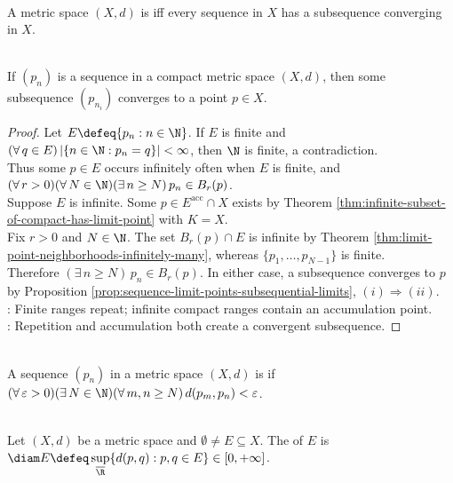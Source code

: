 \begin{definition} \label{def:sequentially-compact-metric-space} \\
A metric space $(X,d)$ is  iff every sequence in $X$ has a subsequence converging in $X$.
\end{definition}

\begin{theorem} \label{thm:compact-sequential-subsequence} \\
If $(p_n)$ is a sequence in a compact metric space $(X,d)$, then some subsequence $(p_{n_i})$ converges to a point $p\in X$.
\begin{proof}
Let $E\defeq\{p_n:n\in\N\}$. If $E$ is finite and $(\forall\,q\in E)\,|\{n\in\N:p_n=q\}|<\infty$, then $\N$ is finite, a contradiction.\\
Thus some $p\in E$ occurs infinitely often when $E$ is finite, and $(\forall\,r>0)(\forall\,N\in\N)(\exists\,n\geq N)\,p_n\in B_r(p)$.\\
Suppose $E$ is infinite. Some $p\in E^{\operatorname{acc}}\cap X$ exists by Theorem \ref{thm:infinite-subset-of-compact-has-limit-point} with $K=X$.\\
Fix $r>0$ and $N\in\N$. The set $B_r(p)\cap E$ is infinite by Theorem \ref{thm:limit-point-neighborhoods-infinitely-many}, whereas $\{p_1,\ldots,p_{N-1}\}$ is finite.\\
Therefore $(\exists\,n\geq N)\,p_n\in B_r(p)$. In either case, a subsequence converges to $p$ by Proposition \ref{prop:sequence-limit-points-subsequential-limits}, $(i)\Rightarrow(ii)$.\\
: Finite ranges repeat; infinite compact ranges contain an accumulation point.\\
: Repetition and accumulation both create a convergent subsequence.
\end{proof}
\end{theorem}

\begin{definition} \label{def:cauchy-sequence} \\
A sequence $(p_n)$ in a metric space $(X,d)$ is  if $(\forall\,\varepsilon>0)(\exists\,N\in\N)(\forall\,m,n\geq N)\, d(p_m,p_n)<\varepsilon$.
\end{definition}

\begin{definition} \label{def:diameter-of-metric-set} \\
Let $(X,d)$ be a metric space and $\emptyset\ne E\subseteq X$. The  of $E$ is $\diam E\defeq\sup\limits_{\overline{\R}}\{d(p,q):p,q\in E\}\in[0,+\infty]$.
\end{definition}

